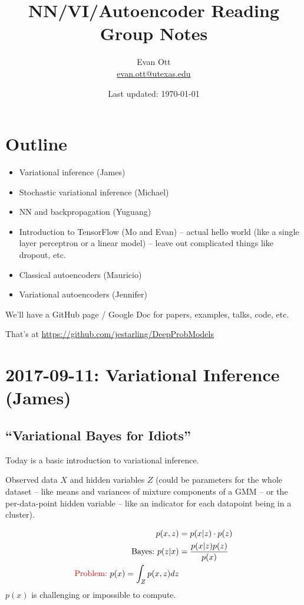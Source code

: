 \documentclass{article}
\title{\vspace{-6ex}NN/VI/Autoencoder Reading Group Notes\vspace{-2ex}}
\author{Evan Ott \\ \href{mailto:evan.ott@utexas.edu}{evan.ott@utexas.edu}\vspace{-2ex}}
\date{Last updated: \today}
\begin{document}
\maketitle

\section{Outline}
\begin{itemize}
  \item Variational inference (James)
  \item Stochastic variational inference (Michael)
  \item NN and backpropagation (Yuguang)
  \item Introduction to TensorFlow (Mo and Evan) -- actual hello world (like a single layer perceptron or a linear model) -- leave out complicated things like dropout, etc.
  \item Classical autoencoders (Mauricio)
  \item Variational autoencoders (Jennifer)
\end{itemize}

We'll have a GitHub page / Google Doc for papers, examples, talks, code, etc.

That's at \url{https://github.com/jestarling/DeepProbModels}

\section{2017-09-11: Variational Inference (James)}
\subsection{``Variational Bayes for Idiots''}
Today is a basic introduction to variational inference.

Observed data $X$ and hidden variables $Z$ (could be parameters for the whole dataset
-- like means and variances of mixture components of a GMM -- or the per-data-point hidden variable -- like an indicator
for each datapoint being in a cluster).

\begin{align*}
  p(x,z)&= p(x|z)\cdot p(z)
  \\
  \textrm{Bayes:~} p(z|x)&=\frac{p(x|z)p(z)}{p(x)}
  \\
  \textrm{\color{red}Problem:~\color{black}} p(x)=\int_Z p(x,z)dz
\end{align*}
$p(x)$ is challenging or impossible to compute.
\end{document}
